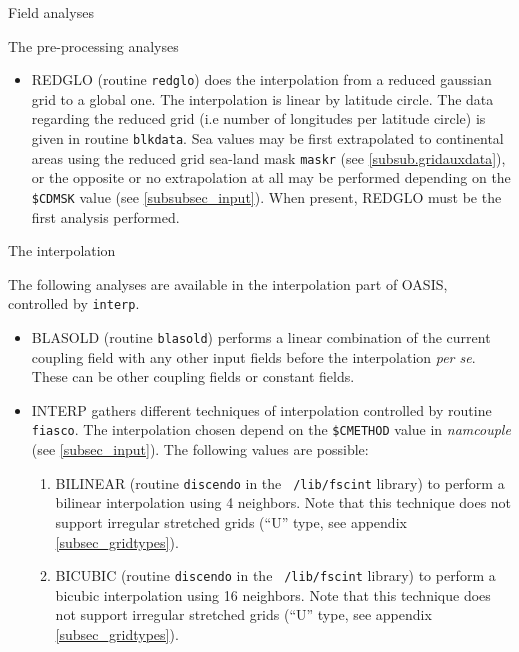 \begin{subsection}{Field analyses}
\begin{subsubsection}{The pre-processing analyses}
\begin{itemize}
\item REDGLO (routine {\tt redglo}) does the interpolation from a 
reduced gaussian grid to a global one. The interpolation is linear 
by latitude circle. The data regarding the reduced grid (i.e number of
longitudes per latitude circle) is given in routine {\tt blkdata}. 
Sea values may be first extrapolated to continental areas 
using the reduced grid sea-land mask {\tt maskr} (see
\ref{subsub.gridauxdata}), or the opposite or no
extrapolation at all may be performed depending on the
{\tt \$CDMSK} value (see \ref{subsubsec_input}). When present, REDGLO
must be the first analysis performed.

\end{itemize}

\end{subsubsection}

\begin{subsubsection}{The interpolation}
\label{subsubsec_interp}

The following analyses are available in the interpolation part of
OASIS, controlled by {\tt interp}.

\begin{itemize}

\item BLASOLD (routine {\tt blasold}) performs a linear combination 
of the current coupling field with any other input fields before the
interpolation {\it per se}. These can be other coupling fields 
or constant fields. 


\item INTERP gathers different techniques of interpolation controlled
by routine {\tt fiasco}. The interpolation chosen depend on the
{\tt \$CMETHOD} value in {\em namcouple} (see \ref{subsec_input}). The
following values are possible:

   \begin{enumerate}

   \item BILINEAR (routine {\tt discendo} in the {\tt
    /lib/fscint} library) to perform a bilinear interpolation using 4
    neighbors. Note
    that this technique does not support irregular stretched grids
    (``U'' type, see appendix \ref{subsec_gridtypes}).

   \item BICUBIC (routine {\tt discendo} in the {\tt
    /lib/fscint} library) to perform a bicubic interpolation using 16
    neighbors. Note
    that this technique does not support irregular stretched grids
    (``U'' type, see appendix \ref{subsec_gridtypes}).


\end{enumerate}
\end{itemize}
\end{subsubsection}
\end{subsection}
